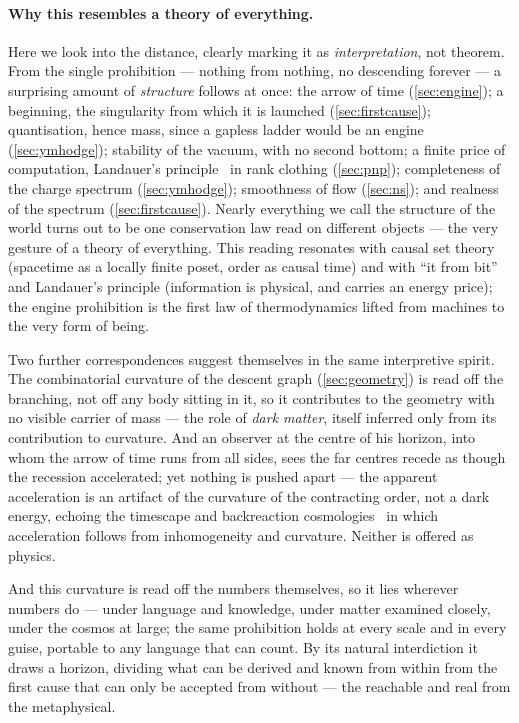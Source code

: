 \paragraph{Why this resembles a theory of everything.}
Here we look into the distance, clearly marking it as \emph{interpretation}, not theorem. From the
single prohibition --- nothing from nothing, no descending forever --- a surprising amount of
\emph{structure} follows at once: the arrow of time (\cref{sec:engine}); a beginning, the
singularity from which it is launched (\cref{sec:firstcause}); quantisation, hence mass, since a
gapless ladder would be an engine (\cref{sec:ymhodge}); stability of the vacuum, with no second
bottom; a finite price of computation, Landauer's principle~\cite{landauer1961} in rank clothing (\cref{sec:pnp});
completeness of the charge spectrum (\cref{sec:ymhodge}); smoothness of flow (\cref{sec:ns}); and
realness of the spectrum (\cref{sec:firstcause}). Nearly everything we call the structure of the
world turns out to be one conservation law read on different objects --- the very gesture of a
theory of everything. This reading resonates with causal set theory (spacetime as a locally finite
poset, order as causal time) and with ``it from bit'' and Landauer's principle (information is
physical, and carries an energy price); the engine prohibition is the first law of thermodynamics
lifted from machines to the very form of being.

Two further correspondences suggest themselves in the same interpretive spirit. The combinatorial
curvature of the descent graph (\cref{sec:geometry}) is read off the branching, not off any body
sitting in it, so it contributes to the geometry with no visible carrier of mass --- the role of
\emph{dark matter}, itself inferred only from its contribution to curvature. And an observer at the
centre of his horizon, into whom the arrow of time runs from all sides, sees the far centres recede
as though the recession accelerated; yet nothing is pushed apart --- the apparent acceleration is an
artifact of the curvature of the contracting order, not a dark energy, echoing the timescape and
backreaction cosmologies~\cite{wiltshire2007} in which acceleration follows from inhomogeneity and
curvature. Neither is offered as physics.

And this curvature is read off the numbers themselves, so it lies wherever numbers do --- under
language and knowledge, under matter examined closely, under the cosmos at large; the same
prohibition holds at every scale and in every guise, portable to any language that can count. By its
natural interdiction it draws a horizon, dividing what can be derived and known from within from the
first cause that can only be accepted from without --- the reachable and real from the metaphysical.

